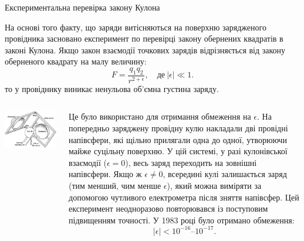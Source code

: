 \documentclass[onlytextwidth]{beamer}
\begin{document}
\begin{frame}{Експериментальна перевірка закону Кулона}{}\small
\begin{block}{}\justifying
    На основі того факту, що \alert{заряди витісняються на поверхню зарядженого провідника} засновано \alert{експеримент по перевірці закону обернених
    квадратів в законі Кулона}. Якщо закон взаємодії точкових зарядів відрізняється від закону оберненого квадрату на малу величину:
\begin{equation*}
F = \frac{q_1 q_2}{r^{2 + \epsilon}},\quad \text{де}\ |\epsilon| \ll 1.
\end{equation*}
то у провіднику виникає ненульова об'ємна густина заряду.
\end{block}
\begin{columns}
	\begin{column}{0.4\linewidth}
         \includegraphics[width=\linewidth]{cavindesh_exp}
	\end{column}
	\begin{column}{0.59\linewidth}
 \begin{block}{}\justifying\footnotesize
    Це було використано для отримання обмеження на $\epsilon$. На попередньо заряджену провідну кулю накладали дві провідні напівсфери, які
щільно прилягали одна до одної, утворюючи майже суцільну поверхню. У цій системі, у разі кулонівської взаємодії ($\epsilon = 0$), весь заряд
переходить на зовнішні напівсфери. Якщо ж $\epsilon \neq 0$, всередині кулі залишається заряд (тим менший, чим менше $\epsilon$), який можна
виміряти за допомогою чутливого електрометра після зняття напівсфер. Цей експеримент неодноразово повторювався із поступовим підвищенням точності. У
1983 році було отримано обмеження:
\begin{equation*}
|\epsilon| < 10^{-16} \text{–} 10^{-17}.
\end{equation*}
\end{block}
	\end{column}
\end{columns}

\end{frame}
\end{document}
